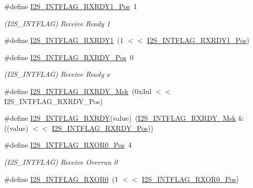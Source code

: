 \begin{DoxyCompactItemize}
\item 
\#define \mbox{\hyperlink{group___s_a_m_d21___i2_s_ga3872451a6ff3dac098d309ac91a07224}{I2\+S\+\_\+\+I\+N\+T\+F\+L\+A\+G\+\_\+\+R\+X\+R\+D\+Y1\+\_\+\+Pos}}~1
\begin{DoxyCompactList}\small\item\em (I2\+S\+\_\+\+I\+N\+T\+F\+L\+AG) Receive Ready 1 \end{DoxyCompactList}\item 
\#define \mbox{\hyperlink{group___s_a_m_d21___i2_s_ga68e15a0e4da0ca3240848b7119b1717f}{I2\+S\+\_\+\+I\+N\+T\+F\+L\+A\+G\+\_\+\+R\+X\+R\+D\+Y1}}~(1 $<$$<$ \mbox{\hyperlink{group___s_a_m_d21___i2_s_ga3872451a6ff3dac098d309ac91a07224}{I2\+S\+\_\+\+I\+N\+T\+F\+L\+A\+G\+\_\+\+R\+X\+R\+D\+Y1\+\_\+\+Pos}})
\item 
\#define \mbox{\hyperlink{group___s_a_m_d21___i2_s_gaf35339d81893f2eb7074bda7576ed732}{I2\+S\+\_\+\+I\+N\+T\+F\+L\+A\+G\+\_\+\+R\+X\+R\+D\+Y\+\_\+\+Pos}}~0
\begin{DoxyCompactList}\small\item\em (I2\+S\+\_\+\+I\+N\+T\+F\+L\+AG) Receive Ready x \end{DoxyCompactList}\item 
\#define \mbox{\hyperlink{group___s_a_m_d21___i2_s_ga93d66c990592148cd8581b65a74eb2e1}{I2\+S\+\_\+\+I\+N\+T\+F\+L\+A\+G\+\_\+\+R\+X\+R\+D\+Y\+\_\+\+Msk}}~(0x3ul $<$$<$ I2\+S\+\_\+\+I\+N\+T\+F\+L\+A\+G\+\_\+\+R\+X\+R\+D\+Y\+\_\+\+Pos)
\item 
\#define \mbox{\hyperlink{group___s_a_m_d21___i2_s_gaf6b6f5d15bf306558145429949367186}{I2\+S\+\_\+\+I\+N\+T\+F\+L\+A\+G\+\_\+\+R\+X\+R\+DY}}(value)~(\mbox{\hyperlink{group___s_a_m_d21___i2_s_ga93d66c990592148cd8581b65a74eb2e1}{I2\+S\+\_\+\+I\+N\+T\+F\+L\+A\+G\+\_\+\+R\+X\+R\+D\+Y\+\_\+\+Msk}} \& ((value) $<$$<$ \mbox{\hyperlink{group___s_a_m_d21___i2_s_gaf35339d81893f2eb7074bda7576ed732}{I2\+S\+\_\+\+I\+N\+T\+F\+L\+A\+G\+\_\+\+R\+X\+R\+D\+Y\+\_\+\+Pos}}))
\item 
\#define \mbox{\hyperlink{group___s_a_m_d21___i2_s_gaea01a5af5d62e72433ff5a4576fb2a5a}{I2\+S\+\_\+\+I\+N\+T\+F\+L\+A\+G\+\_\+\+R\+X\+O\+R0\+\_\+\+Pos}}~4
\begin{DoxyCompactList}\small\item\em (I2\+S\+\_\+\+I\+N\+T\+F\+L\+AG) Receive Overrun 0 \end{DoxyCompactList}\item 
\#define \mbox{\hyperlink{group___s_a_m_d21___i2_s_ga5bad75f86ed54c371c28f35a026183ea}{I2\+S\+\_\+\+I\+N\+T\+F\+L\+A\+G\+\_\+\+R\+X\+O\+R0}}~(1 $<$$<$ \mbox{\hyperlink{group___s_a_m_d21___i2_s_gaea01a5af5d62e72433ff5a4576fb2a5a}{I2\+S\+\_\+\+I\+N\+T\+F\+L\+A\+G\+\_\+\+R\+X\+O\+R0\+\_\+\+Pos}})

\end{DoxyCompactItemize}
